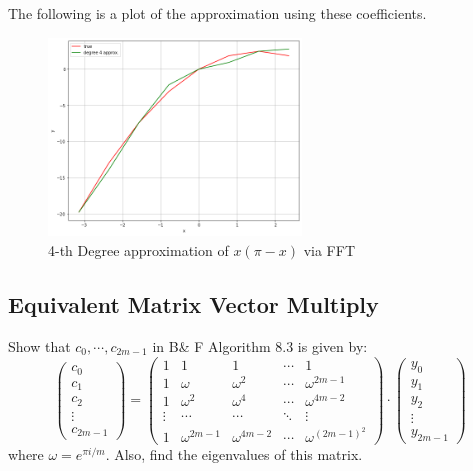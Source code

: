 \documentclass[12pt]{article} %
\newcommand{\1}[1]{\mathds{1}\left[#1\right]}
\begin{document}
The following is a plot of the approximation using these coefficients.

\begin{figure}[h]
\caption{4-th Degree approximation of $x(\pi -x)$ via FFT}
\centering
\includegraphics[width=0.6\textwidth]{hw8p3b.png}
\end{figure}





\newpage
\subsection{Equivalent Matrix Vector Multiply}
Show that $c_0, \cdots, c_{2m-1}$ in B\& F Algorithm 8.3 is given by:
$$
	\begin{pmatrix}
		c_0 \\
		c_1 \\
		c_2 \\
		\vdots\\
		c_{2m-1}
	\end{pmatrix} = 
	\begin{pmatrix}
		1 & 1 & 1 & \cdots & 1 \\
		1 & \omega & \omega^2 & \cdots & \omega^{2m-1} \\
		1 & \omega^2 & \omega^4 & \cdots & \omega^{4m-2} \\
		\vdots & \cdots & \cdots & \ddots & \vdots  \\
		1 & \omega^{2m-1} & \omega^{4m-2} & \cdots & \omega^{(2m-1)^2}
	\end{pmatrix} \cdot
	\begin{pmatrix}
		y_0 \\
		y_1\\
		y_2\\
		\vdots\\
		y_{2m-1}
	\end{pmatrix}
$$ where $\omega = e^{\pi i/m}$. Also, find the eigenvalues of this matrix.
\end{document}
